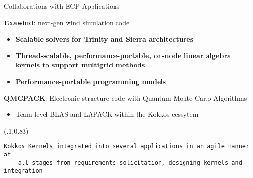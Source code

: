 \begin{frame}[fragile]{Collaborations with ECP Applications}

\textbf{Exawind}: next-gen wind simulation code
\begin{itemize}
  \item \textbf{Scalable solvers for Trinity and Sierra architectures}
  \item \textbf{Thread-scalable, performance-portable, on-node linear algebra kernels to support multigrid methods}
  \item \textbf{Performance-portable programming models}
\end{itemize}

\textbf{QMCPACK}: Electronic structure code with Quantum Monte Carlo Algorithms
\begin{itemize}
  \item Team level BLAS and LAPACK within the Kokkos ecssytem
\end{itemize}

\begin{textblock*}{1.0\textwidth}(.1\textwidth,0.83\textheight)
  \begin{lstlisting}[frame=single, backgroundcolor=\color{blue!10}, basicstyle=\tiny, breaklines=true, boxpos=c]
    Kokkos Kernels integrated into several applications in an agile manner at 
    all stages from requirements solicitation, designing kernels and integration
  \end{lstlisting}
\end{textblock*}

\end{frame}


